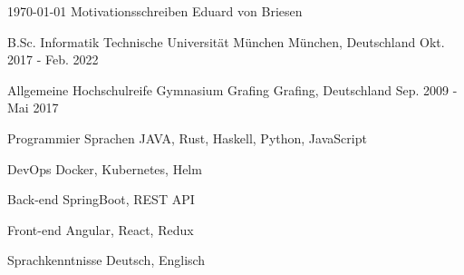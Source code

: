 \documentclass[11pt, a4paper]{awesome-cv}
\begin{document}
\makecvheader

\makecvfooter
{\today}
{Motivationsschreiben}
{Eduard von Briesen}

\begin{cventries}

  \cventry
  {B.Sc. Informatik} %
  {Technische Universität München} %
  {München, Deutschland} %
  {Okt. 2017 - Feb. 2022} %
  {}

  \cventry
  {Allgemeine Hochschulreife} %
  {Gymnasium Grafing} %
  {Grafing, Deutschland} %
  {Sep. 2009 - Mai 2017} %
  {}

\end{cventries}


\begin{cvskills}

  \cvskill
  {Programmier Sprachen} %
  {JAVA, Rust, Haskell, Python, JavaScript} %

  \cvskill
  {DevOps} %
  {Docker, Kubernetes, Helm} %

  \cvskill
  {Back-end} %
  {SpringBoot, REST API} %

  \cvskill
  {Front-end} %
  {Angular, React, Redux} %

  \cvskill
  {Sprachkenntnisse} %
  {Deutsch, Englisch} %

\end{cvskills}
\end{document}
